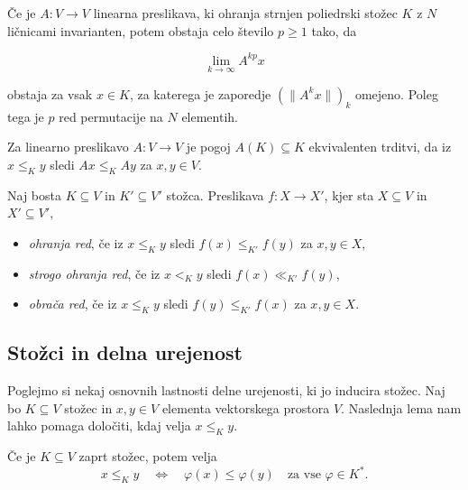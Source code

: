 \documentclass[mat2, tisk]{fmfdelo}
\begin{document}
\begin{izrek}
Če je $A : V \to V$ linearna preslikava, ki ohranja strnjen poliedrski
stožec $K$ z $N$ ličnicami invarianten, potem obstaja celo število $p \ge 1$ tako, da


\[
\lim_{k \to \infty} A^{kp} x
\]


obstaja za vsak $x \in K$, za katerega je zaporedje ${(\|A^{k}x\|)}_{k}$
omejeno. Poleg tega je $p$ red permutacije na $N$ elementih.
\end{izrek}

Za linearno preslikavo $A : V \to V$ je pogoj $A(K) \subseteq K$ ekvivalenten
trditvi, da iz $x \le_{K} y$ sledi $Ax \le_{K} Ay$ za $x, y \in V$. 

\begin{definicija}
  Naj bosta $K \subseteq V$ in $K' \subseteq V'$ stožca. 
  Preslikava $f : X \to X'$, kjer sta 
  $X \subseteq V$ in $X' \subseteq V'$, 
  \begin{itemize}
    \item \emph{ohranja red},
    če iz $x \le_{K} y$ sledi $f(x) \le_{K'} f(y)$ za $x, y \in X$,
    \item \emph{strogo ohranja red}, če iz $x <_{K} y$ sledi
    $f(x) \ll_{K'} f(y)$,
    \item \emph{obrača red}, če iz 
    $x \le_{K} y$ sledi $f(y) \le_{K'} f(x)$  za $x, y \in X$.
  \end{itemize}
\end{definicija}




\subsection{Stožci in delna urejenost}
Poglejmo si nekaj osnovnih lastnosti delne urejenosti, ki jo inducira stožec.
Naj bo $K \subseteq V$ stožec in $x, y \in V$ elementa vektorskega prostora $V$. 
Naslednja lema nam lahko pomaga določiti, kdaj velja $x \leq_K y$.

\begin{lema}\label{lema2.31}
Če je $K \subseteq V$ zaprt stožec, potem velja
\[
x \leq_K y \quad \Longleftrightarrow \quad \varphi(x) \leq \varphi(y)
\quad \text{za vse } \varphi \in K^*.
\]
\end{lema}
\end{document}
